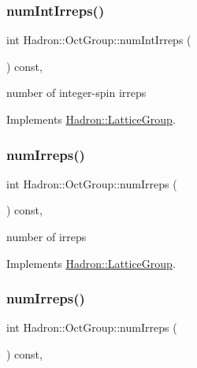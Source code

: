 \subsubsection{\texorpdfstring{numIntIrreps()}{numIntIrreps()}\hspace{0.1cm}{\footnotesize\ttfamily [2/2]}}
{\footnotesize\ttfamily int Hadron\+::\+Oct\+Group\+::num\+Int\+Irreps (\begin{DoxyParamCaption}{ }\end{DoxyParamCaption}) const\hspace{0.3cm}{\ttfamily [inline]}, {\ttfamily [virtual]}}

number of integer-\/spin irreps 

Implements \mbox{\hyperlink{structHadron_1_1LatticeGroup_af2aa7b39222bf188389356eefcef7547}{Hadron\+::\+Lattice\+Group}}.

\mbox{\label{structHadron_1_1OctGroup_aed56aa6c4ed7e2a82048b478c916b9d2}} 
\subsubsection{\texorpdfstring{numIrreps()}{numIrreps()}\hspace{0.1cm}{\footnotesize\ttfamily [1/2]}}
{\footnotesize\ttfamily int Hadron\+::\+Oct\+Group\+::num\+Irreps (\begin{DoxyParamCaption}{ }\end{DoxyParamCaption}) const\hspace{0.3cm}{\ttfamily [inline]}, {\ttfamily [virtual]}}

number of irreps 

Implements \mbox{\hyperlink{structHadron_1_1LatticeGroup_a3edaca488144b5d2a9cf73fe653add34}{Hadron\+::\+Lattice\+Group}}.

\mbox{\label{structHadron_1_1OctGroup_aed56aa6c4ed7e2a82048b478c916b9d2}} 
\subsubsection{\texorpdfstring{numIrreps()}{numIrreps()}\hspace{0.1cm}{\footnotesize\ttfamily [2/2]}}
{\footnotesize\ttfamily int Hadron\+::\+Oct\+Group\+::num\+Irreps (\begin{DoxyParamCaption}{ }\end{DoxyParamCaption}) const\hspace{0.3cm}{\ttfamily [inline]}, {\ttfamily [virtual]}}

